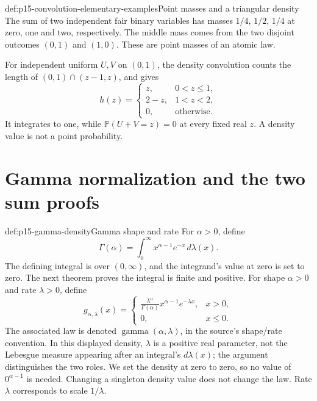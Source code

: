 \begin{hbexample}{def:p15-convolution-elementary-examples}{Point masses and a triangular density}
The sum of two independent fair binary variables has masses \(1/4\),
\(1/2\), \(1/4\) at zero, one and two, respectively. The middle
mass comes from the two disjoint outcomes \((0,1)\) and \((1,0)\).
These are point masses of an atomic law.

For independent uniform \(U,V\) on \((0,1)\), the density convolution
counts the length of \((0,1)\cap(z-1,z)\), and gives
\[
 h(z)=\begin{cases}
 z,&0<z\leq1,\\
 2-z,&1<z<2,\\
 0,&\text{otherwise}.
 \end{cases}
\]
It integrates to one, while \(\mathbb P(U+V=z)=0\) at every
fixed real \(z\). A density value is not a point probability.
\end{hbexample}

\section{Gamma normalization and the two sum proofs}
\label{sec:p15-gamma-convolution}

\begin{hbdefinition}{def:p15-gamma-density}{Gamma shape and rate}
For \(\alpha>0\), define
\[
 \Gamma(\alpha)=\int_0^\infty x^{\alpha-1}e^{-x}\,d\lambda(x).
\]
The defining integral is over \((0,\infty)\), and the integrand's
value at zero is set to zero. The next theorem proves the integral
is finite and positive.
For shape
\(\alpha>0\) and rate \(\lambda>0\), define
\[
 g_{\alpha,\lambda}(x)=\begin{cases}
 \displaystyle\frac{\lambda^\alpha}{\Gamma(\alpha)}
                 x^{\alpha-1}e^{-\lambda x},&x>0,\\
 0,&x\leq0.
 \end{cases}
\]
The associated law is denoted \(\operatorname{gamma}(\alpha,\lambda)\),
in the source's shape/rate convention. In this displayed density,
\(\lambda\) is a positive real parameter, not the Lebesgue measure
appearing after an integral's \(d\lambda(x)\); the argument distinguishes
the two roles. We set the density at zero to zero, so no value of
\(0^{\alpha-1}\) is needed. Changing a singleton density value
does not change the law. Rate \(\lambda\) corresponds to scale
\(1/\lambda\).
\end{hbdefinition}

